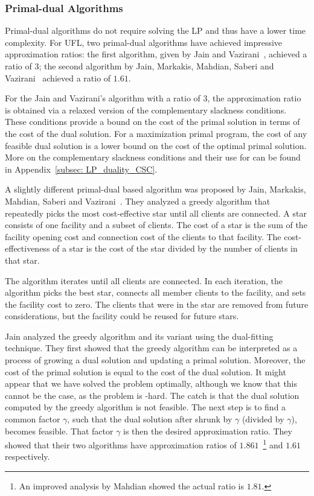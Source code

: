 \documentclass[oneside,final]{ucr}
\begin{document}
\subsubsection{Primal-dual Algorithms}
Primal-dual algorithms do not require solving the LP and
thus have a lower time complexity. For UFL, two primal-dual
algorithms have achieved impressive approximation ratios:
the first algorithm, given by Jain and
Vazirani~\cite{JainV01}, achieved a ratio of $3$; the second
algorithm by Jain, Markakis, Mahdian, Saberi and
Vazirani~\cite{JainMMSV03} achieved a ratio of $1.61$.

For the Jain and Vazirani's algorithm with a ratio of $3$,
the approximation ratio is obtained via a relaxed version of
the complementary slackness conditions. These conditions
provide a bound on the cost of the primal solution in terms
of the cost of the dual solution. For a maximization primal
program, the cost of any feasible dual solution is a lower
bound on the cost of the optimal primal solution. More on
the complementary slackness conditions and their use for
{\UFL} can be found in Appendix~\ref{subsec:
  LP_duality_CSC}.

A slightly different primal-dual based algorithm was
proposed by Jain, Markakis, Mahdian, Saberi and
Vazirani~\cite{JainMMSV03}. They analyzed a greedy algorithm
that repeatedly picks the most cost-effective star until all
clients are connected. A star consists of one facility and a
subset of clients. The cost of a star is the sum of the
facility opening cost and connection cost of the clients to
that facility. The cost-effectiveness of a star is the cost
of the star divided by the number of clients in that
star.

The algorithm iterates until all clients are connected. In
each iteration, the algorithm picks the best star, connects
all member clients to the facility, and sets the facility
cost to zero. The clients that were in the star are removed
from future considerations, but the facility could be reused
for future stars.

Jain {\etal} analyzed the greedy algorithm and its variant
using the dual-fitting technique. They first showed that the
greedy algorithm can be interpreted as a process of growing
a dual solution and updating a primal solution. Moreover,
the cost of the primal solution is equal to the cost of the
dual solution. It might appear that we have solved the
{\UFL} problem optimally, although we know that this cannot
be the case, as the {\UFL} problem is {\NP}-hard. The catch
is that the dual solution computed by the greedy algorithm
is not feasible. The next step is to find a common factor
$\gamma$, such that the dual solution after shrunk by
$\gamma$ (divided by $\gamma$), becomes feasible. That
factor $\gamma$ is then the desired approximation
ratio. They showed that their two algorithms have
approximation ratios of $1.861$~\footnote{An improved
  analysis by Mahdian showed the actual ratio is $1.81$.}
and $1.61$ respectively.
\end{document}
